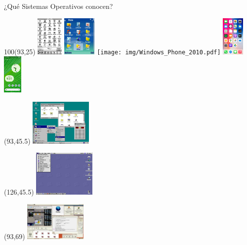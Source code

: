 \documentclass[aspectratio=169]{beamer}
\begin{document}
\begin{frame}{¿Qué Sistemas Operativos conocen?}
\begin{textblock}{80}
    \end{textblock}
    \begin{textblock}{100}(93,25)
    \includegraphics[height=1.93cm]{img/Apple_NewtonOS_1993.png} \hspace{0.01cm}
    \includegraphics[height=1.93cm]{img/n80_2005.jpg}
    \texttt{[image: img/Windows\_Phone\_2010.pdf]}
    \includegraphics[height=1.93cm]{img/iOS_2020.png}
    \includegraphics[height=1.93cm]{img/Android_12_2021.png}
    \end{textblock}
    \begin{textblock}{80}(93,45.5) \includegraphics[width=3cm]{img/Windows_1995.png} \end{textblock}
    \begin{textblock}{80}(126,45.5) \includegraphics[width=3cm]{img/Mac_OS_9.0.4_1999.png} \end{textblock}
    \begin{textblock}{80}(93,69) \includegraphics[width=3cm]{img/Darwin_GNOME_2_2004.png} \end{textblock}

\end{frame}
\end{document}

